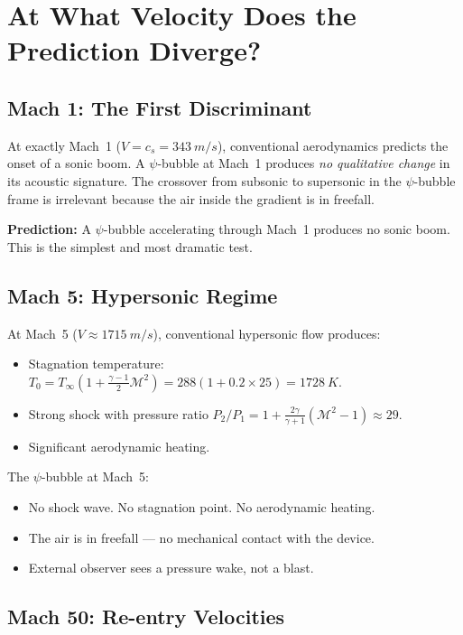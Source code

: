 \documentclass[12pt, letterpaper]{article}
\theoremstyle{definition}
\theoremstyle{remark}
\newcommand{\cs}{c_s}
\newcommand{\Mach}{\mathcal{M}}
\begin{document}
\section{At What Velocity Does the Prediction Diverge?}
\label{sec:divergence}

\subsection{Mach 1: The First Discriminant}

At exactly Mach~1 ($V = \cs = \SI{343}{m/s}$), conventional aerodynamics
predicts the onset of a sonic boom. A $\psi$-bubble at Mach~1 produces
\emph{no qualitative change} in its acoustic signature. The crossover from
subsonic to supersonic in the $\psi$-bubble frame is irrelevant because the
air inside the gradient is in freefall.

\textbf{Prediction:} A $\psi$-bubble accelerating through Mach~1 produces no
sonic boom. This is the simplest and most dramatic test.

\subsection{Mach 5: Hypersonic Regime}

At Mach~5 ($V \approx \SI{1715}{m/s}$), conventional hypersonic flow produces:
\begin{itemize}
\item Stagnation temperature: $T_0 = T_\infty(1 + \frac{\gamma-1}{2}\Mach^2)
= 288(1 + 0.2 \times 25) = \SI{1728}{K}$.
\item Strong shock with pressure ratio $P_2/P_1 = 1 + \frac{2\gamma}{\gamma+1}(\Mach^2 - 1) \approx 29$.
\item Significant aerodynamic heating.
\end{itemize}

The $\psi$-bubble at Mach~5:
\begin{itemize}
\item No shock wave. No stagnation point. No aerodynamic heating.
\item The air is in freefall --- no mechanical contact with the device.
\item External observer sees a pressure wake, not a blast.
\end{itemize}

\subsection{Mach 50: Re-entry Velocities}
\end{document}
